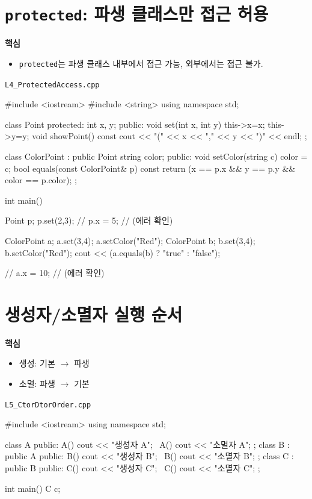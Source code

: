 \documentclass[11pt,a4paper]{article}
\newcommand{\filetag}[1]{\texttt{\color{Accent}#1}}
\begin{document}
\section{\texttt{protected}: 파생 클래스만 접근 허용}
\begin{GoalBox}
\textbf{핵심}
\begin{itemize}[leftmargin=18pt]
  \item \texttt{protected}는 파생 클래스 내부에서 접근 가능, 외부에서는 접근 불가.
\end{itemize}
\end{GoalBox}

\noindent\filetag{L4\_ProtectedAccess.cpp}
\begin{cppcode}
#include <iostream>
#include <string>
using namespace std;

class Point {
protected:
    int x, y;
public:
    void set(int x, int y) { this->x=x; this->y=y; }
    void showPoint() const { cout << "(" << x << "," << y << ")" << endl; }
};

class ColorPoint : public Point {
    string color;
public:
    void setColor(string c) { color = c; }
    bool equals(const ColorPoint& p) const {
        return (x == p.x && y == p.y && color == p.color);
    }
};

int main() {
    Point p;
    p.set(2,3);
    // p.x = 5; // (에러 확인)

    ColorPoint a; a.set(3,4); a.setColor("Red");
    ColorPoint b; b.set(3,4); b.setColor("Red");
    cout << (a.equals(b) ? "true\n" : "false\n");

    // a.x = 10; // (에러 확인)
}
\end{cppcode}

\section{생성자/소멸자 실행 순서}
\begin{GoalBox}
\textbf{핵심}
\begin{itemize}[leftmargin=18pt]
  \item 생성: 기본 $\rightarrow$ 파생
  \item 소멸: 파생 $\rightarrow$ 기본
\end{itemize}
\end{GoalBox}

\noindent\filetag{L5\_CtorDtorOrder.cpp}
\begin{cppcode}
#include <iostream>
using namespace std;

class A {
public:
    A() { cout << "생성자 A\n"; }
    ~A() { cout << "소멸자 A\n"; }
};
class B : public A {
public:
    B() { cout << "생성자 B\n"; }
    ~B() { cout << "소멸자 B\n"; }
};
class C : public B {
public:
    C() { cout << "생성자 C\n"; }
    ~C() { cout << "소멸자 C\n"; }
};

int main() { C c; }
\end{cppcode}
\end{document}
